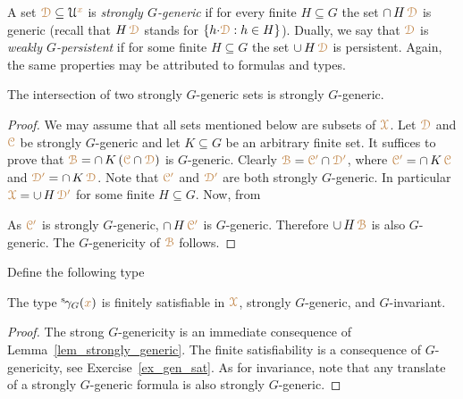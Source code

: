 A set ${\color{brown}\EuScript D}\subseteq\EuScript U^{\color{brown} x}$ is \emph{strongly $G$-generic\/} if for every finite $H\subseteq G$ the set $\cap\,H\,{\color{brown}\EuScript D}$ is generic (recall that $H\,{\color{brown}\EuScript D}$ stands for $\{h{\cdot}{\color{brown}\EuScript D}: h\in H\}$).
Dually, we say that ${\color{brown}\EuScript D}$ is \emph{weakly $G$-persistent\/} if for some finite $H\subseteq G$ the set $\cup\,H\,{\color{brown}\EuScript D}$ is persistent.
Again, the same properties may be attributed to formulas and types.

\begin{lemma}\label{lem_strongly_generic}
  The intersection of two strongly $G$-generic sets is strongly $G$-generic.
\end{lemma}

\begin{proof}
  We may assume that all sets mentioned below are subsets of ${\color{brown}\EuScript X}$.
  Let ${\color{brown}\EuScript D}$ and ${\color{brown}\EuScript C}$ be strongly $G$-generic and let $K\subseteq G$ be an arbitrary finite set.
  It suffices to prove that ${\color{brown}\EuScript B}=\cap\, K\,({\color{brown}\EuScript C}\cap{\color{brown}\EuScript D})$ is $G$-generic. 
  Clearly ${\color{brown}\EuScript B}={\color{brown}\EuScript C'}\cap{\color{brown}\EuScript D'}$, where ${\color{brown}\EuScript C'}=\cap\, K\,{\color{brown}\EuScript C}$ and ${\color{brown}\EuScript D'}=\cap\, K\,{\color{brown}\EuScript D}$.
  Note that ${\color{brown}\EuScript C'}$ and ${\color{brown}\EuScript D'}$ are both strongly $G$-generic.
  In particular ${\color{brown}\EuScript X}=\cup\,H\,\color{brown}\EuScript D'$ for some finite $H\subseteq G$.
  Now, from
  

  
  
  
  As ${\color{brown}\EuScript C'}$ is strongly $G$-generic, $\cap\, H\,{\color{brown}\EuScript C'}$ is $G$-generic.
  Therefore $\cup\,H\,{\color{brown}\EuScript B}$ is also $G$-generic.
  The $G$-genericity of ${\color{brown}\EuScript B}$ follows.
\end{proof}

Define the following type


\begin{corollary}\label{corol_str_gen}
  The type ${}^{\rm s}\kern-.2ex\gamma_G({\color{brown} x})$ is finitely satisfiable in ${\color{brown}\EuScript X}$, strongly $G$-generic, and $G$-invariant.
\end{corollary}

\begin{proof}
  The strong $G$-genericity is an immediate consequence of Lemma~\ref{lem_strongly_generic}.
  The finite satisfiability is a consequence of $G$-genericity, see Exercise~\ref{ex_gen_sat}.
  As for invariance, note that any translate of a strongly $G$-generic formula is also strongly $G$-generic.
\end{proof}

